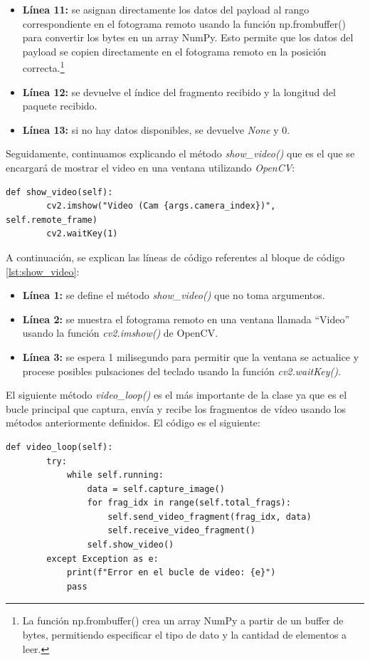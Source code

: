 \begin{itemize}
    \item \textbf{Línea 11:} se asignan directamente los datos del payload al rango correspondiente en el fotograma remoto usando la función np.frombuffer() para convertir los bytes en un array NumPy. Esto permite que los datos del payload se copien directamente en el fotograma remoto en la posición correcta.\footnote{La función np.frombuffer() crea un array NumPy a partir de un buffer de bytes, permitiendo especificar el tipo de dato y la cantidad de elementos a leer.}
    \item \textbf{Línea 12:} se devuelve el índice del fragmento recibido y la longitud del paquete recibido.
    \item \textbf{Línea 13:} si no hay datos disponibles, se devuelve \textit{None} y 0.
\end{itemize}
\vspace{\baselineskip}

Seguidamente, continuamos explicando el método \textit{show\_video()} que es el que se encargará de mostrar el video en una ventana utilizando \textit{OpenCV}:
\begin{lstlisting}[style=pythonstyle, caption={Método show\_video() de \textit{Minimal\_Video}}, label={lst:show_video}]
    def show_video(self):
        cv2.imshow("Video (Cam {args.camera_index})", self.remote_frame)
        cv2.waitKey(1)
\end{lstlisting}

A continuación, se explican las líneas de código referentes al bloque de código \ref{lst:show_video}:
\begin{itemize}
    \item \textbf{Línea 1:} se define el método \textit{show\_video()} que no toma argumentos.
    \item \textbf{Línea 2:} se muestra el fotograma remoto en una ventana llamada ``Video'' usando la función \textit{cv2.imshow()} de OpenCV.
    \item \textbf{Línea 3:} se espera 1 milisegundo para permitir que la ventana se actualice y procese posibles pulsaciones del teclado usando la función \textit{cv2.waitKey()}.
\end{itemize}
\vspace{\baselineskip}

El siguiente método \textit{video\_loop()} es el más importante de la clase ya que es el bucle principal que captura, envía y recibe los fragmentos de vídeo usando los métodos anteriormente definidos. El código es el siguiente:
\begin{lstlisting}[style=pythonstyle, caption={Método video\_loop() de \textit{Minimal\_Video}}, label={lst:video_loop_minimal_video}]
def video_loop(self):
        try:
            while self.running:
                data = self.capture_image()
                for frag_idx in range(self.total_frags):
                    self.send_video_fragment(frag_idx, data)
                    self.receive_video_fragment()
                self.show_video()
        except Exception as e:
            print(f"Error en el bucle de video: {e}")
            pass
\end{lstlisting}

